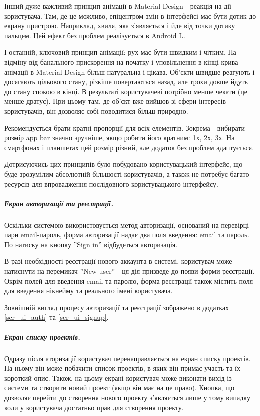 \documentclass[../main.tex]{subfiles}
\begin{document}
Інший дуже важливий принцип анімації в Material Design - реакція на дії користувача. Там, де це можливо, епіцентром змін в інтерфейсі має бути дотик до екрану пристрою. Наприклад, хвиля, яка з'являється і йде від точки дотику пальцем. Цей ефект без проблем реалізується в Android L.

І останній, ключовий принцип анімації: рух має бути швидким і чітким. На відміну від банального прискорення на початку і уповільнення в кінці крива анімації в Material Design більш натуральна і цікава. Об'єкти швидше реагують і досягають цільового стану, різкіше повертаються назад, але трохи довше йдуть до стану спокою в кінці. В результаті користувачеві потрібно менше чекати (це менше дратує). При цьому там, де об'єкт вже вийшов зі сфери інтересів користувачів, він дозволяє собі поводитися більш природно.

Рекомендується брати кратні пропорції для всіх елементів. Зокрема - вибирати розмір app bar значно зручніше, якщо робити його кратним: 1х, 2х, 3х. На смартфонах і планшетах цей розмір різний, але додаток без проблем адаптується.

Дотрисуючись цих принципів було побудовано користувацький інтерфейс, що буде зрозумілим абсолютній більшості користувачів, а також не потребує багато ресурсів для впровадження послідовного користувацького інтерфейсу.

\subparagraph{Екран авторизації та реєстрації.}

Оскільки системою використовується метод авторизації, оснований на перевірці пари email-пароль, форма авторизації надає два поля введення: email та пароль. По натиску на кнопку ''Sign in'' відбудеться авторизація.

В разі необхідності реєстрації нового аккаунта в системі, користувач може натиснути на перемикач ''New user'' - ця дія призведе до появи форми реєстрації. Окрім полей для введення email та паролю, форма реєстрації також містить поля для введення нікнейму та реального імені користувача.

Зовнішній вигляд процесу авторизації та реєстрації зображено в додатках \ref{scr_ui_auth} та \ref{scr_ui_signup}.

\subparagraph{Екран списку проектів.}

Одразу після аторизації користувач перенаправляється на екран списку проектів. На ньому він може побачити список проектів, в яких він примає участь та їх короткий опис. Також, на цьому екрані користувач може виконати вихід із системи та створити новий проект (якщо він має на це право). Кнопка, що дозволяє перейти до створення нового проекту з'являється лише у тому випадку коли у користувача достатньо прав для створення проекту.
\end{document}
